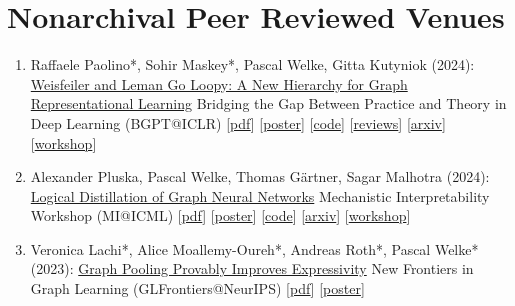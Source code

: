 \documentclass{scrartcl}
\begin{document}
\section{Nonarchival Peer Reviewed Venues}
\begin{enumerate}
\conti
\item
\label{maskey2024loopybgpt}
Raffaele Paolino*, Sohir Maskey*, Pascal Welke, Gitta Kutyniok (2024):\newline
\href{https://pwelke.github.io/publications/paolino2024loopyarxiv.pdf}{Weisfeiler and Leman Go Loopy: A New Hierarchy for Graph Representational Learning}\newline
Bridging the Gap Between Practice and Theory in Deep Learning (BGPT@ICLR)\newline
{\footnotesize
[\href{https://pwelke.github.io/publications/paolino2024loopyarxiv.pdf}{pdf}]
[\href{https://pwelke.github.io/publications/paolino2024loopyBGPTposter.pdf}{poster}]
[\href{https://github.com/RPaolino/loopy}{code}]
[\href{https://openreview.net/forum?id=ESTxJjN3tE}{reviews}]
[\href{https://arxiv.org/abs/2403.13749}{arxiv}]
[\href{https://sites.google.com/view/bgpt-iclr24/home}{workshop}]
}
\item
\label{pluska2024logicaldistillationmi}
Alexander Pluska, Pascal Welke, Thomas Gärtner, Sagar Malhotra (2024):\newline
\href{https://pwelke.github.io/publications/pluska2024logicaldistillationkr.pdf}{Logical Distillation of Graph Neural Networks}\newline
Mechanistic Interpretability Workshop (MI@ICML)\newline
{\footnotesize
[\href{https://pwelke.github.io/publications/pluska2024logicaldistillationkr.pdf}{pdf}]
[\href{https://pwelke.github.io/publications/pluska2024logicaldistillationmiposter.pdf}{poster}]
[\href{https://github.com/lexpk/LogicalDistillationOfGNNs}{code}]
[\href{https://arxiv.org/abs/2406.07126}{arxiv}]
[\href{https://icml2024mi.pages.dev/}{workshop}]
}
\item
\label{lmrw2023graphpooling}
Veronica Lachi*, Alice Moallemy-Oureh*, Andreas Roth*, Pascal Welke* (2023):\newline
\href{https://openreview.net/forum?id=lR5NYB9zrv}{Graph Pooling Provably Improves Expressivity}\newline
New Frontiers in Graph Learning (GLFrontiers@NeurIPS)\newline
{\footnotesize
[\href{https://pwelke.github.io/publications/lmrw2023pooling.pdf}{pdf}]
[\href{https://pwelke.github.io/publications/lmrw2023pooling-poster.pdf}{poster}]
}
\end{enumerate}
\end{document}
